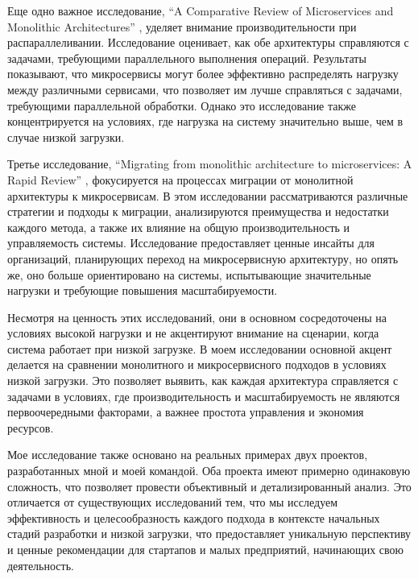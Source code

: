     Еще одно важное исследование, “A Comparative Review of Microservices and Monolithic Architectures” \cite{al2018comparative}, уделяет внимание производительности при распараллеливании. Исследование оценивает, как обе архитектуры справляются с задачами, требующими параллельного выполнения операций. Результаты показывают, что микросервисы могут более эффективно распределять нагрузку между различными сервисами, что позволяет им лучше справляться с задачами, требующими параллельной обработки. Однако это исследование также концентрируется на условиях, где нагрузка на систему значительно выше, чем в случае низкой загрузки.
    
    Третье исследование, “Migrating from monolithic architecture to microservices: A Rapid Review” \cite{ponce2019migrating}, фокусируется на процессах миграции от монолитной архитектуры к микросервисам. В этом исследовании рассматриваются различные стратегии и подходы к миграции, анализируются преимущества и недостатки каждого метода, а также их влияние на общую производительность и управляемость системы. Исследование предоставляет ценные инсайты для организаций, планирующих переход на микросервисную архитектуру, но опять же, оно больше ориентировано на системы, испытывающие значительные нагрузки и требующие повышения масштабируемости.
    
    Несмотря на ценность этих исследований, они в основном сосредоточены на условиях высокой нагрузки и не акцентируют внимание на сценарии, когда система работает при низкой загрузке. В моем исследовании основной акцент делается на сравнении монолитного и микросервисного подходов в условиях низкой загрузки. Это позволяет выявить, как каждая архитектура справляется с задачами в условиях, где производительность и масштабируемость не являются первоочередными факторами, а важнее простота управления и экономия ресурсов.
    
    Мое исследование также основано на реальных примерах двух проектов, разработанных мной и моей командой. Оба проекта имеют примерно одинаковую сложность, что позволяет провести объективный и детализированный анализ. Это отличается от существующих исследований тем, что мы исследуем эффективность и целесообразность каждого подхода в контексте начальных стадий разработки и низкой загрузки, что предоставляет уникальную перспективу и ценные рекомендации для стартапов и малых предприятий, начинающих свою деятельность.

